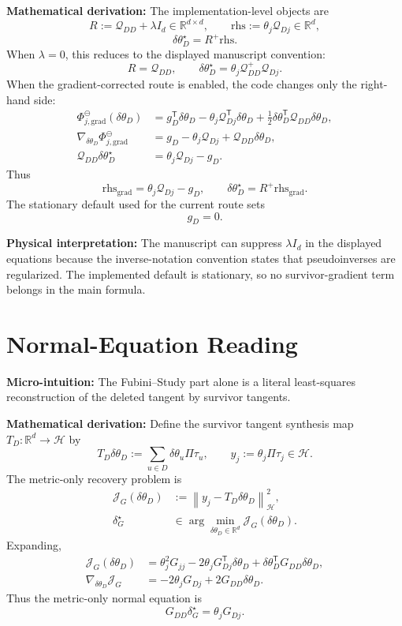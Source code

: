 \documentclass[10pt,twocolumn]{article}
\newcommand{\rhs}{\mathrm{rhs}}
\newcommand{\blocktitle}[1]{\vspace{2pt}\noindent\textbf{#1}\space}
\newcommand{\micro}[1]{\blocktitle{Micro-intuition:} #1}
\newcommand{\deriv}{\blocktitle{Mathematical derivation:}}
\newcommand{\phys}[1]{\blocktitle{Physical interpretation:} #1}
\begin{document}
\deriv
The implementation-level objects are
\[
R:=\mathcal Q_{DD}+\lambda I_d\in\mathbb R^{d\times d},
\qquad
\rhs:=\theta_j\mathcal Q_{Dj}\in\mathbb R^d,
\]
\[
\delta\theta_D^\star=R^+\rhs.
\]
When \(\lambda=0\), this reduces to the displayed manuscript convention:
\[
R=\mathcal Q_{DD},
\qquad
\delta\theta_D^\star
=
\theta_j\mathcal Q_{DD}^{+}\mathcal Q_{Dj}.
\]
When the gradient-corrected route is enabled, the code changes only the right-hand side:
\[
\begin{aligned}
\Phi_{j,\mathrm{grad}}^\ominus(\delta\theta_D)
&=
g_D^{\mathsf T}\delta\theta_D
-\theta_j\mathcal Q_{Dj}^{\mathsf T}\delta\theta_D
+\frac12\delta\theta_D^{\mathsf T}\mathcal Q_{DD}\delta\theta_D,
\\
\nabla_{\delta\theta_D}\Phi_{j,\mathrm{grad}}^\ominus
&=
g_D-\theta_j\mathcal Q_{Dj}+\mathcal Q_{DD}\delta\theta_D,
\\
\mathcal Q_{DD}\delta\theta_D^\star
&=
\theta_j\mathcal Q_{Dj}-g_D .
\end{aligned}
\]
Thus
\[
\rhs_{\mathrm{grad}}
=
\theta_j\mathcal Q_{Dj}-g_D,
\qquad
\delta\theta_D^\star
=
R^+\rhs_{\mathrm{grad}}.
\]
The stationary default used for the current route sets
\[
g_D=0.
\]

\phys{The manuscript can suppress \(\lambda I_d\) in the displayed equations because the inverse-notation convention states that pseudoinverses are regularized. The implemented default is stationary, so no survivor-gradient term belongs in the main formula.}

\section*{Normal-Equation Reading}

\micro{The Fubini--Study part alone is a literal least-squares reconstruction of the deleted tangent by survivor tangents.}

\deriv
Define the survivor tangent synthesis map \(T_D:\mathbb R^d\to\mathcal H\) by
\[
T_D\delta\theta_D
:=
\sum_{u\in D}\delta\theta_u\Pi\tau_u,
\qquad
y_j:=\theta_j\Pi\tau_j\in\mathcal H .
\]
The metric-only recovery problem is
\[
\begin{aligned}
\mathcal J_G(\delta\theta_D)
&:=
\left\|
y_j-T_D\delta\theta_D
\right\|_{\mathcal H}^2,
\\
\delta_G^\star
&\in
\arg\min_{\delta\theta_D\in\mathbb R^d}
\mathcal J_G(\delta\theta_D).
\end{aligned}
\]
Expanding,
\[
\begin{aligned}
\mathcal J_G(\delta\theta_D)
&=
\theta_j^2G_{jj}
-2\theta_jG_{Dj}^{\mathsf T}\delta\theta_D
+\delta\theta_D^{\mathsf T}G_{DD}\delta\theta_D,
\\
\nabla_{\delta\theta_D}\mathcal J_G
&=
-2\theta_jG_{Dj}
+2G_{DD}\delta\theta_D .
\end{aligned}
\]
Thus the metric-only normal equation is
\[
G_{DD}\delta_G^\star=\theta_jG_{Dj}.
\]
\end{document}
